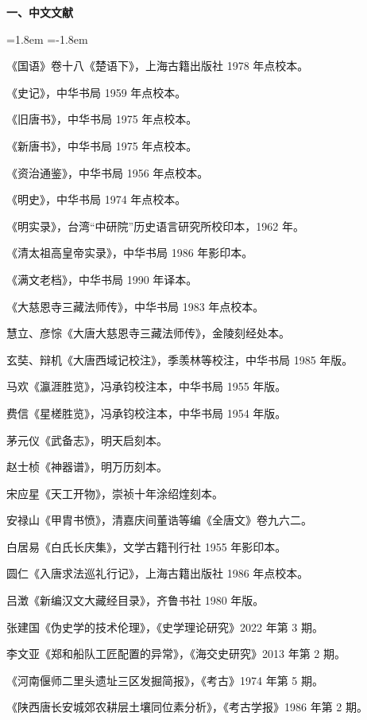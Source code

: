 \begingroup
\footnotesize
\linespread{1.25}\selectfont
\setlength{\parindent}{0pt}
\setlength{\parskip}{1.6pt}

\noindent\textbf{一、中文文献}\par
\vspace{2mm}
\begin{list}{}{\leftmargin=1.8em \itemindent=-1.8em \topsep=0pt \parsep=1.4pt \itemsep=0pt}
\item 《国语》卷十八《楚语下》，上海古籍出版社 1978 年点校本。
\item 《史记》，中华书局 1959 年点校本。
\item 《旧唐书》，中华书局 1975 年点校本。
\item 《新唐书》，中华书局 1975 年点校本。
\item 《资治通鉴》，中华书局 1956 年点校本。
\item 《明史》，中华书局 1974 年点校本。
\item 《明实录》，台湾“中研院”历史语言研究所校印本，1962 年。
\item 《清太祖高皇帝实录》，中华书局 1986 年影印本。
\item 《满文老档》，中华书局 1990 年译本。
\item 《大慈恩寺三藏法师传》，中华书局 1983 年点校本。
\item 慧立、彦悰《大唐大慈恩寺三藏法师传》，金陵刻经处本。
\item 玄奘、辩机《大唐西域记校注》，季羡林等校注，中华书局 1985 年版。
\item 马欢《瀛涯胜览》，冯承钧校注本，中华书局 1955 年版。
\item 费信《星槎胜览》，冯承钧校注本，中华书局 1954 年版。
\item 茅元仪《武备志》，明天启刻本。
\item 赵士桢《神器谱》，明万历刻本。
\item 宋应星《天工开物》，崇祯十年涂绍煃刻本。
\item 安禄山《甲胄书愤》，清嘉庆间董诰等编《全唐文》卷九六二。
\item 白居易《白氏长庆集》，文学古籍刊行社 1955 年影印本。
\item 圆仁《入唐求法巡礼行记》，上海古籍出版社 1986 年点校本。
\item 吕澂《新编汉文大藏经目录》，齐鲁书社 1980 年版。
\item 张建国《伪史学的技术伦理》，《史学理论研究》2022 年第 3 期。
\item 李文亚《郑和船队工匠配置的异常》，《海交史研究》2013 年第 2 期。
\item 《河南偃师二里头遗址三区发掘简报》，《考古》1974 年第 5 期。
\item 《陕西唐长安城郊农耕层土壤同位素分析》，《考古学报》1986 年第 2 期。
\end{list}

